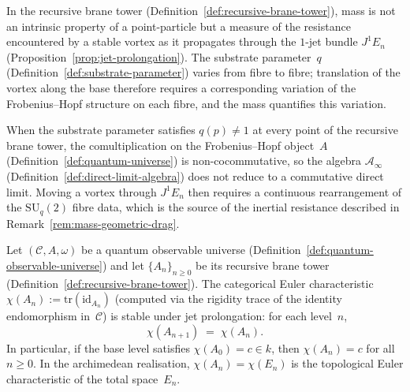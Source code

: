 
\begin{remark}
\label{rem:mass-geometric-drag}
In the recursive brane tower (Definition~\ref{def:recursive-brane-tower}),
mass is not an intrinsic property of a point-particle but a measure of the
resistance encountered by a stable vortex as it propagates through the
$1$-jet bundle $J^1 E_n$ (Proposition~\ref{prop:jet-prolongation}).  The
substrate parameter~$q$ (Definition~\ref{def:substrate-parameter}) varies from
fibre to fibre; translation of the vortex along the base therefore requires a
corresponding variation of the Frobenius--Hopf structure on each fibre, and
the mass quantifies this variation.
\end{remark}

\begin{remark}
\label{rem:mass-noncommutative-drag}
When the substrate parameter satisfies $q(p) \neq 1$ at every point of the recursive brane tower, the comultiplication on the Frobenius--Hopf object~$A$
(Definition~\ref{def:quantum-universe}) is non-cocommutative, so the
algebra $\mathcal{A}_\infty$ (Definition~\ref{def:direct-limit-algebra})
does not reduce to a commutative direct limit.  Moving a vortex through
$J^1 E_n$ then requires a continuous rearrangement of the
$\mathrm{SU}_q(2)$ fibre data, which is the source of the inertial
resistance described in Remark~\ref{rem:mass-geometric-drag}.
\end{remark}

\begin{proposition}
\label{prop:euler-char-stability}
Let $(\mathcal{C}, A, \omega)$ be a quantum observable universe
(Definition~\ref{def:quantum-observable-universe}) and let
$\{A_n\}_{n \geq 0}$ be its recursive brane tower
(Definition~\ref{def:recursive-brane-tower}).  The categorical Euler
characteristic $\chi(A_n) := \mathrm{tr}(\mathrm{id}_{A_n})$ (computed
via the rigidity trace of the identity endomorphism in~$\mathcal{C}$)
is stable under jet prolongation: for each level~$n$,
\[
  \chi(A_{n+1}) \;=\; \chi(A_n).
\]
In particular, if the base level satisfies $\chi(A_0) = c \in k$, then
$\chi(A_n) = c$ for all $n \geq 0$.  In the archimedean realisation,
$\chi(A_n) = \chi(E_n)$ is the topological Euler characteristic of the
total space~$E_n$.
\end{proposition}

